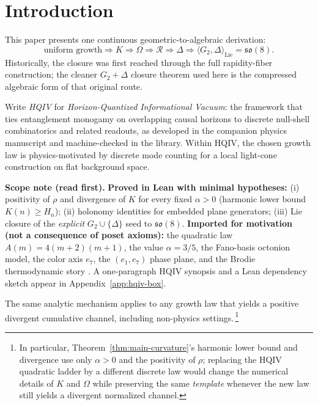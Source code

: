 \documentclass[11pt]{amsart}
\begin{document}
\section{Introduction}

This paper presents one continuous geometric-to-algebraic derivation:
\[
\text{uniform growth} \Longrightarrow K \Longrightarrow \Omega \Longrightarrow \mathcal R
\Longrightarrow \Delta \Longrightarrow \langle G_2,\Delta\rangle_{\mathrm{Lie}}=\mathfrak{so}(8).
\]
Historically, the closure was first reached through the full rapidity-fiber construction; the cleaner \(G_2+\Delta\) closure theorem used here is the compressed algebraic form of that original route.

Write \emph{HQIV} for \emph{Horizon-Quantized Informational Vacuum}: the framework that ties entanglement monogamy on overlapping causal horizons to discrete null-shell combinatorics and related readouts, as developed in the companion physics manuscript and machine-checked in the \cite{hqiv-lean} library.
Within HQIV, the chosen growth law is physics-motivated by discrete mode counting for a local light-cone construction on flat background space.

\medskip
\noindent\textbf{Scope note (read first).}
\textbf{Proved in Lean with minimal hypotheses:} (i) positivity of \(\rho\) and divergence of \(K\) for every fixed \(\alpha>0\) (harmonic lower bound \(K(n)\ge H_n\)); (ii) holonomy identities for embedded plane generators; (iii) Lie closure of the \emph{explicit} \(G_2\cup\{\Delta\}\) seed to \(\mathfrak{so}(8)\).
\textbf{Imported for motivation (not a consequence of poset axioms):} the quadratic law \(A(m)=4(m+2)(m+1)\), the value \(\alpha=3/5\), the Fano-basis octonion model, the color axis \(e_7\), the \((e_1,e_7)\) phase plane, and the Brodie thermodynamic story \cite{brodie2026}.
A one-paragraph HQIV synopsis and a Lean dependency sketch appear in Appendix~\ref{app:hqiv-box}.

The same analytic mechanism applies to any growth law that yields a positive divergent cumulative channel, including non-physics settings.\,\footnote{In particular, Theorem~\ref{thm:main-curvature}'s harmonic lower bound and divergence use only \(\alpha>0\) and the positivity of \(\rho\); replacing the HQIV quadratic ladder by a different discrete law would change the numerical details of \(K\) and \(\Omega\) while preserving the same \emph{template} whenever the new law still yields a divergent normalized channel.}
\end{document}
